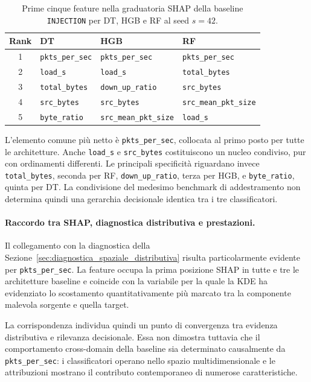 \begin{table}[H]
    \centering
    \small
    \caption{Prime cinque feature nella graduatoria SHAP della baseline \texttt{INJECTION} per DT, HGB e RF al seed $s=42$.}
    \label{tab:baseline_shap_top5}
    \begin{tabular}{c|lll}
        \toprule
        \textbf{Rank} & \textbf{DT} & \textbf{HGB} & \textbf{RF} \\
        \midrule
        1 & \texttt{pkts\_per\_sec} & \texttt{pkts\_per\_sec} & \texttt{pkts\_per\_sec} \\
        2 & \texttt{load\_s} & \texttt{load\_s} & \texttt{total\_bytes} \\
        3 & \texttt{total\_bytes} & \texttt{down\_up\_ratio} & \texttt{src\_bytes} \\
        4 & \texttt{src\_bytes} & \texttt{src\_bytes} & \texttt{src\_mean\_pkt\_size} \\
        5 & \texttt{byte\_ratio} & \texttt{src\_mean\_pkt\_size} & \texttt{load\_s} \\
        \bottomrule
    \end{tabular}
\end{table}

L'elemento comune più netto è \texttt{pkts\_per\_sec}, collocata al primo posto per tutte le architetture. 
Anche \texttt{load\_s} e \texttt{src\_bytes} costituiscono un nucleo condiviso, pur con ordinamenti differenti. 
Le principali specificità riguardano invece \texttt{total\_bytes}, seconda per RF, \texttt{down\_up\_ratio}, terza per HGB, e \texttt{byte\_ratio}, quinta per DT. 
La condivisione del medesimo benchmark di addestramento non determina quindi una gerarchia decisionale identica tra i tre classificatori.

\paragraph{Raccordo tra SHAP, diagnostica distributiva e prestazioni.}
Il collegamento con la diagnostica della Sezione~\ref{sec:diagnostica_spaziale_distributiva} risulta particolarmente evidente per \texttt{pkts\_per\_sec}. 
La feature occupa la prima posizione SHAP in tutte e tre le architetture baseline e coincide con la variabile per la quale la KDE ha evidenziato lo scostamento quantitativamente più marcato tra la componente malevola sorgente e quella target.

La corrispondenza individua quindi un punto di convergenza tra evidenza distributiva e rilevanza decisionale. 
Essa non dimostra tuttavia che il comportamento cross-domain della baseline sia determinato causalmente da \texttt{pkts\_per\_sec}: i classificatori operano nello spazio multidimensionale e le attribuzioni mostrano il contributo contemporaneo di numerose caratteristiche.

